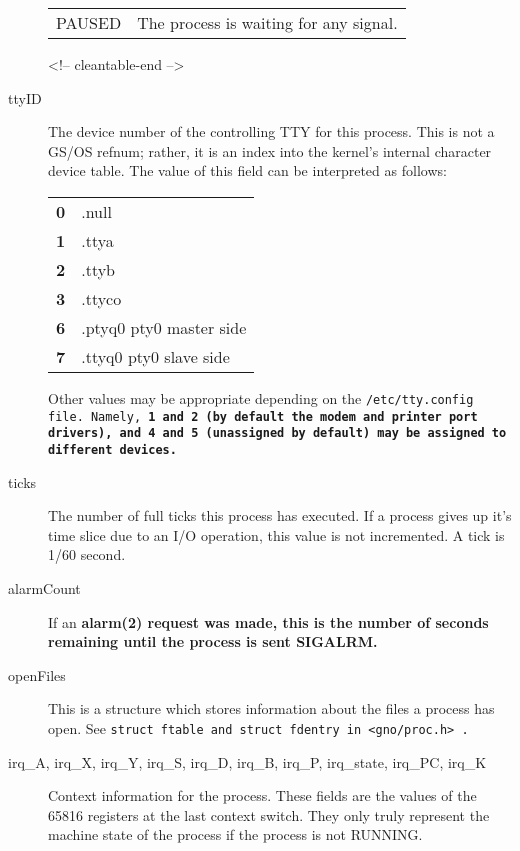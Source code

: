 \documentclass{report}
\begin{document}
\begin{description}
\begin{tabular}{ll}
PAUSED  &
\begin{minipage}[t]{8cm}
	The process is waiting for any signal.
\end{minipage} \hfill \\

\end{tabular}

\begin{rawhtml}
<!-- cleantable-end -->
\end{rawhtml}


\item[ttyID]
The device number of the 
controlling TTY for this process.
This is not a GS/OS refnum; rather, it is an index into the kernel's internal
character device table.
The value of this field can be interpreted as follows:

\begin{tabular}{rl}
\bf{0}	&	.null \\
\bf{1}	&	.ttya \\
\bf{2}	&	.ttyb \\
\bf{3}	&	.ttyco \\
\bf{6}	&	.ptyq0 pty0 master side \\
\bf{7}	&	.ttyq0 pty0 slave side \\
\end{tabular}

Other values may be appropriate depending
on the 
\tt /etc/tty.config \rm file. Namely, \bf 1 \rm and \bf 2 \rm
(by default the modem and printer port drivers), and \bf 4 \rm and 
\bf 5 \rm (unassigned by default) may be assigned to different devices.


\item[ticks]
The number of full ticks this process has executed. If a process gives up
it's time slice due to an I/O operation, this value is not incremented.
A tick is 1/60 second.

\item[alarmCount]
If an 
\bf alarm\rm(2) request was made, this is the number of seconds
remaining until the process is sent SIGALRM.

\item[openFiles]
This is a structure which stores information about the files a
process has open. See \tt struct ftable \rm and \tt struct fdentry \rm
in \tt <gno/proc.h> \rm.

\item[irq\_{}A, irq\_{}X, irq\_{}Y, irq\_{}S, irq\_{}D, irq\_{}B, 
irq\_{}P, irq\_{}state, irq\_{}PC, irq\_{}K]
Context information for the process. These fields are the values of the
65816 registers 
at the last context switch. They only truly represent the
machine state of the process if the process is not RUNNING.


\end{description}
\end{document}
